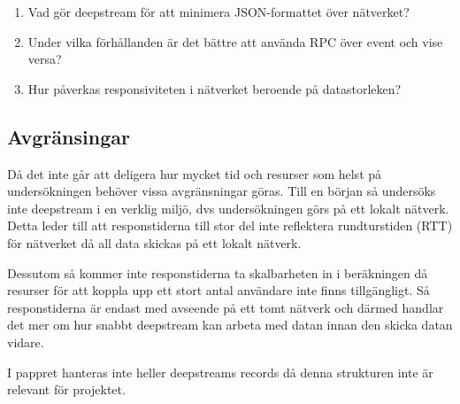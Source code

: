 \begin{enumerate}

\item\label{tim-fs:1} Vad gör deepstream för att minimera JSON-formattet över nätverket?

\item\label{tim-fs:2} Under vilka förhållanden är det bättre att använda RPC över event och vise versa?

\item\label{tim-fs:3} Hur påverkas responsiviteten i nätverket beroende på datastorleken?  


\end{enumerate}

\subsection{Avgränsingar}
\label{subsec:tim-delimitations}
Då det inte går att deligera hur mycket tid och resurser som helst på undersökningen behöver vissa avgränsningar göras. Till en början så undersöks inte deepstream i en verklig miljö, dvs undersökningen görs på ett lokalt nätverk. Detta leder till att responstiderna till stor del inte reflektera rundturstiden (RTT) för nätverket då all data skickas på ett lokalt nätverk.

Dessutom så kommer inte responstiderna ta skalbarheten in i beräkningen då resurser för att koppla upp ett stort antal användare inte finns tillgängligt. Så responstiderna är endast med avseende på ett tomt nätverk och därmed handlar det mer om hur snabbt deepstream kan arbeta med datan innan den skicka datan vidare.

I pappret hanteras inte heller deepstreams records då denna strukturen inte är relevant för projektet.
